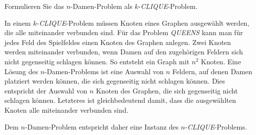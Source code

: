Formulieren Sie das $n$-Damen-Problem als $k$-\textit{CLIQUE}-Problem.

\begin{loesung}
In einem $k$-\textit{CLIQUE}-Problem müssen Knoten eines Graphen
ausgewählt werden, die alle miteinander verbunden sind.
Für das Problem \textit{QUEENS} kann man für jedes Feld des Spielfeldes
einen Knoten des Graphen anlegen.
Zwei Knoten werden miteinander verbunden, wenn Damen auf den zugehörigen
Feldern sich nicht gegenseitig schlagen können.
So entsteht ein Graph mit $n^2$ Knoten.
Eine Lösung des $n$-Damen-Problems ist eine Auswahl von $n$ Feldern,
auf denen Damen platziert werden können, die sich gegenseitig
nicht schlagen können.
Dies entspricht der Auswahl von $n$ Knoten des Graphen, die sich
gegenseitig nicht schlagen können.
Letzteres ist gleichbedeutend damit, dass die ausgewählten Knoten
alle miteinander verbunden sind.

Dem $n$-Damen-Problem entspricht daher eine Instanz des
$n$-\textit{CLIQUE}-Problems.
\end{loesung}
